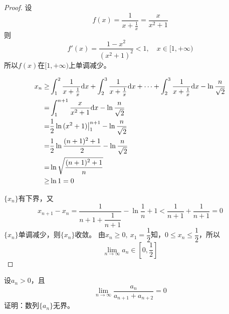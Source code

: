 \begin{proof}

    设
    $$f(x) = \dfrac{1}{x + \frac{1}{x}} = \dfrac{x}{x^2 + 1}$$
    则
    $$f'(x) = \dfrac{1-x^2}{(x^2 + 1)^2} < 1,\quad x\in[1,+\infty)$$
    所以$f(x)$在$[1,+\infty)$上单调减少。

    \begin{align*}
        x_n \geq & \int_{1}^{2}{\dfrac{1}{x+\frac{1}{x}}}\mathrm{d} x + \int_{2}^{3}{\dfrac{1}{x+\frac{1}{x}}}\mathrm{d} x + \cdots + \int_{2}^{3}{\dfrac{1}{x+\frac{1}{x}}}\mathrm{d} x - \ln{\dfrac{n}{\sqrt{2}}} \\
        = & \int_{1}^{n+1}{\dfrac{x}{x^2 + 1}}\mathrm{d} x - \ln{\dfrac{n}{\sqrt{2}}} \\
        = & \dfrac{1}{2} \ln{(x^2 + 1)} \big|_{1}^{n+1} - \ln{\dfrac{n}{\sqrt{2}}} \\
        = & \dfrac{1}{2} \ln{\dfrac{(n+1)^2 + 1}{2}} - \ln{\dfrac{n}{\sqrt{2}}} \\
        = & \ln{\sqrt{\dfrac{(n+1)^2 + 1}{n}}} \\
        \geq & \ln1 = 0 
    \end{align*}

    $\{x_n\}$有下界，又
    $$x_{n+1} - x_n = \dfrac{1}{n+1 + \dfrac{1}{n+1}} - \ln{\dfrac{1}{n} + 1} < \dfrac{1}{n+1} + \dfrac{1}{n+1} = 0$$
    $\{x_n\}$单调减少，则$\{x_n\}$收敛。
    由$x_n \geq 0,\ x_1 = \dfrac{1}{2} $知，$0 \leq x_n \leq \dfrac{1}{2}$，所以
    $$\lim_{n\to\infty}{a_n} \in [0,\dfrac{1}{2}]$$

\end{proof}

\begin{proposition}

    设$a_n > 0$，且
    $$\lim_{n\to\infty}{\dfrac{a_n}{a_{n+1} + a_{n+2}}} = 0$$
    证明：数列$\{a_n\}$无界。
    
\end{proposition}

